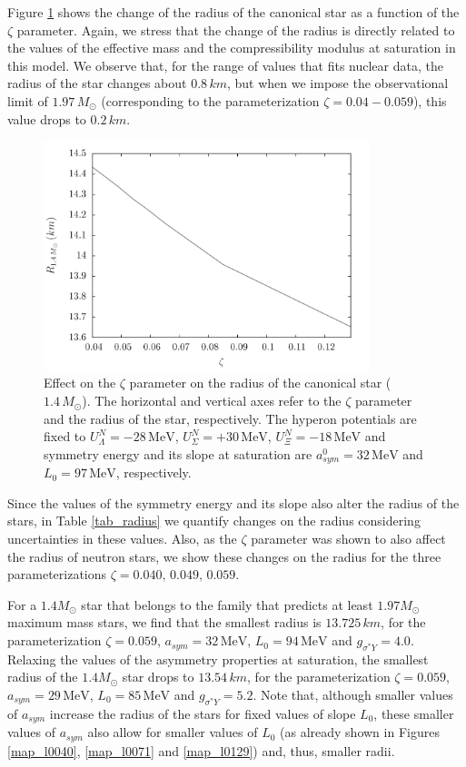 \documentclass[twocolumn,showpacs,aps]{revtex4}
\begin{document}
Figure \ref{radius14_lambda} shows the change of the radius of the canonical star as a function of the 
$\zeta$ parameter. Again, we stress that the change of the radius is directly related to the values
of the effective mass and the compressibility modulus at saturation in this model.
We observe that, for the range of values that fits nuclear data, the radius of the star changes 
about $0.8\,km$, but when we impose the observational limit of $1.97\,M_{\odot}$ (corresponding to the parameterization $\zeta=0.04-0.059$), 
this value drops to $0.2\,km$. 

 \begin{figure}
 \centering
 \vspace{1.0cm}
 \includegraphics[width=9.5cm]{radius14_paper_lambda.png}
 \caption{\label{radius14_lambda} Effect on the $\zeta$ parameter on the radius of the canonical star ($1.4\,M_{\odot}$). 
 The horizontal and vertical axes refer to the $\zeta$ parameter and the radius of the star, respectively. 
The hyperon potentials are fixed to $U_{\Lambda}^N=-28 \,\mathrm{MeV}$, $U_{\Sigma}^N=+30 \,\mathrm{MeV}$, $U_{\Xi}^N=-18 \,\mathrm{MeV}$ 
 and symmetry energy and its slope at saturation are $a_{sym}^0= 32 \,\mathrm{MeV}$ and $L_0=97\,\mathrm{MeV}$, respectively.}
 \end{figure}

 Since the values of the symmetry energy and its slope also alter the radius of the stars, 
 in Table \ref{tab_radius} we quantify changes on the radius considering uncertainties in these values.
 Also, as the $\zeta$ parameter was shown to also affect the radius of neutron stars, we show these
 changes on the radius for the three parameterizations $\zeta=0.040,\,0.049,\,0.059$.
 
 For a $1.4M_{\odot}$ star that belongs to the family that predicts at least $1.97M_{\odot}$ maximum mass stars, 
 we find that the smallest radius is $13.725\,km$, for the parameterization $\zeta=0.059$, $a_{sym}=32\,\mathrm{MeV}$,
 $L_0=94\,\mathrm{MeV}$ and $g_{\sigma^* Y}=4.0$.
 Relaxing the values of the asymmetry properties at saturation, the smallest radius of the  $1.4M_{\odot}$ star
 drops to $13.54\,km$, for the parameterization $\zeta=0.059$, $a_{sym}=29\,\mathrm{MeV}$,
 $L_0=85\,\mathrm{MeV}$ and $g_{\sigma^* Y}=5.2$.
 Note that, although smaller values of $a_{sym}$ increase the radius of the stars for fixed values of slope $L_0$, 
 these smaller values of $a_{sym}$ also allow for smaller values of $L_0$ (as already shown in Figures \ref{map_l0040}, \ref{map_l0071} and \ref{map_l0129})
 and, thus, smaller radii.
 
\end{document}
